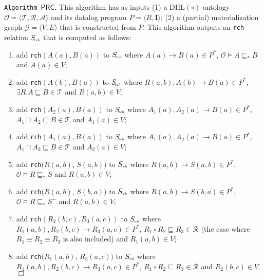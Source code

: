 \noindent\texttt{Algorithm~$\mathsf{PRC}$}. This algorithm has as inputs (1)
a DHL$(\circ)$ ontology $\mathcal{O}=\langle\mathcal{T},\mathcal{R},\mathcal{A}\rangle$
and its datalog program $P=\langle R, \textbf{I}\rangle$;
(2) a (partial) materialization graph $\mathcal{G}=\langle V,E\rangle$ that is constructed from $P$.
This algorithm outputs an \texttt{rch} relation $S_{\!\textit{\tiny rch}}$ that
is computed as follows:

\begin{enumerate}[leftmargin=4ex,label=$\bullet$]
\item add \texttt{rch}$(A(a),B(a))$ to $S_{\textit{\!\tiny rch}}$ where $A(a)\rightarrow B(a)\in P^*$, $\mathcal{O}\models A\sqsubseteq_* B$ and $A(a)\in V$;

\item add \texttt{rch}$(A(b),B(a))$ to $S_{\textit{\!\tiny rch}}$ where $R(a,b),A(b)\rightarrow B(a)\in P^*$, $\exists R.A\sqsubseteq B\in\mathcal{T}$ and $R(a,b)\in V$;

\item add \texttt{rch}$(A_2(a),B(a))$ to $S_{\textit{\!\tiny rch}}$ where $A_1(a),A_2(a)\rightarrow B(a)\in P^*$,
    $A_1\sqcap A_2\sqsubseteq B\in\mathcal{T}$ and $A_1(a)\in V$;

\item add \texttt{rch}$(A_1(a),B(a))$ to $S_{\textit{\!\tiny rch}}$ where $A_1(a),A_2(a)\rightarrow B(a)\in P^*$,
    $A_1\sqcap A_2\sqsubseteq B\in\mathcal{T}$ and $A_2(a)\in V$;

\item add \texttt{rch}$(R(a,b)$, $S(a,b))$ to $S_{\textit{\!\tiny rch}}$ where $R(a,b)\rightarrow S(a,b)\in P^*$,
    $\mathcal{O}\models R\sqsubseteq_* S$ and $R(a,b)\in V$;

\item add \texttt{rch}$(R(a,b)$, $S(b,a))$ to $S_{\textit{\!\tiny rch}}$ where $R(a,b)\rightarrow S(b,a)\in P^*$,
    $\mathcal{O}\models R\sqsubseteq_* S^-$ and $R(a,b)\in V$;

\item add \texttt{rch}$(R_2(b,c),R_3(a,c))$ to $S_{\textit{\!\tiny rch}}$ where $R_1(a,b),R_2(b,c)\rightarrow R_3(a,c)\in P^*$,
    $R_1\circ R_2\sqsubseteq R_3\in\mathcal{R}$ (the case
    where $R_1\equiv R_2\equiv R_3$ is also included) and $R_1(a,b)\in V$;

\item add \texttt{rch}$(R_1(a,b)$, $R_3(a,c))$ to $S_{\textit{\!\tiny rch}}$ where $R_1(a,b),R_2(b,c)\rightarrow R_3(a,c)\in P^*$,
    $R_1\circ R_2\sqsubseteq R_3\in\mathcal{R}$ and $R_2(b,c)\in V$.\hfill$\Box$
\end{enumerate}

